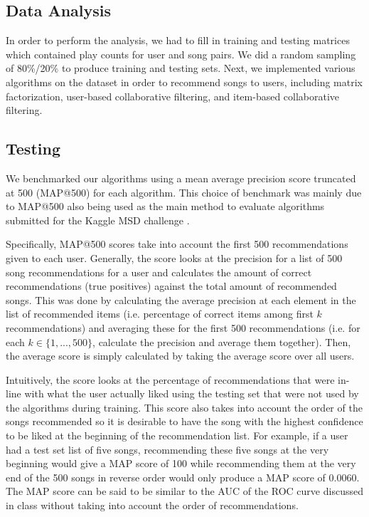 \documentclass[11pt,preprint]{aastex}
\begin{document}
\subsection{Data Analysis}
In order to perform the analysis, we had to fill in training and testing matrices which contained play counts for user and song pairs. We did a random sampling of 80\%/20\% to produce training and testing sets. Next, we implemented various algorithms on the dataset in order to recommend songs to users, including matrix factorization, user-based collaborative filtering, and item-based collaborative filtering.

\subsection{Testing}
We benchmarked our algorithms using a mean average precision score truncated at 500 (MAP@500) for each algorithm. This choice of benchmark was mainly due to MAP@500 also being used as the main method to evaluate algorithms submitted for the Kaggle MSD challenge \citep{McFee:2012:MSD:2187980.2188222}.

Specifically, MAP@500 scores take into account the first 500 recommendations given to each user. Generally, the score looks at the precision for a list of 500 song recommendations for a user and calculates the amount of correct recommendations (true positives) against the total amount of recommended songs. This was done by calculating the average precision at each element in the list of recommended items (i.e. percentage of correct items among first $k$ recommendations) and averaging these for the first 500 recommendations (i.e. for each $k \in \{1, ..., 500\}$, calculate the precision and average them together). Then, the average score is simply calculated by taking the average score over all users.

Intuitively, the score looks at the percentage of recommendations that were in-line with what the user actually liked using the testing set that were not used by the algorithms during training. This score also takes into account the order of the songs recommended so it is desirable to have the song with the highest confidence to be liked at the beginning of the recommendation list. For example, if a user had a test set list of five songs, recommending these five songs at the very beginning would give a MAP score of 100 while recommending them at the very end of the 500 songs in reverse order would only produce a MAP score of 0.0060. The MAP score can be said to be similar to the AUC of the ROC curve discussed in class without taking into account the order of recommendations.
\end{document}
